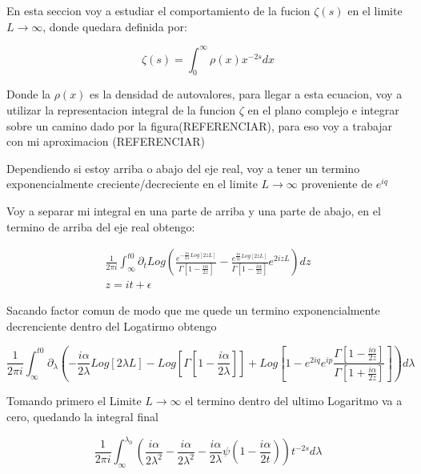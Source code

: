 En esta seccion voy a estudiar el comportamiento de la fucion $\zeta (s) $ en el limite $L \rightarrow \infty$, donde quedara definida por:

\begin{equation}
\zeta (s) = \int _{0} ^{\infty} \rho (x) x^{-2 s} dx
\end{equation}

Donde la $\rho(x) $ es la densidad de autovalores, para llegar a esta ecuacion, voy a utilizar la representacion integral de la funcion $\zeta$ en el plano complejo e integrar sobre un camino dado por la figura(REFERENCIAR), para eso voy a trabajar con mi aproximacion (REFERENCIAR)



Dependiendo si estoy arriba o abajo del eje real, voy a tener un termino exponencialmente creciente/decreciente en el limite $L \rightarrow \infty$ proveniente de $e ^{i q}$

Voy a separar mi integral en una parte de arriba y una parte de abajo, en el termino de arriba del eje real obtengo:

\begin{equation}
\begin{array}{c}
\frac{1}{2 \pi i} \int _{\infty} ^{t0} 
\partial _t
Log
\left(
\frac{e ^{- \frac{i \alpha}{2 \lambda} Log[2 z  L]} }{\Gamma[1-\frac{i \alpha}{2 z }]} -
\frac{e ^{ \frac{i \alpha}{2 z } Log[2 z  L]} }{\Gamma[1-\frac{i \alpha}{2 z }]}
e ^{2 i z  L }
\right) d z \\
z = i t + \epsilon 
\end{array}
\end{equation}

Sacando factor comun de modo que me quede un termino exponencialmente decrenciente dentro del Logatirmo obtengo

\begin{equation}
\frac{1}{2 \pi i}  \int _{\infty} ^{t0} 
\partial _{\lambda}
\left(
-\frac{i\alpha}{2 \lambda} Log[2 \lambda L] - Log[\Gamma[1- \frac{i \alpha}{2 \lambda}]] +
Log[1- e ^{2 i q} e ^{i p} \frac{ \Gamma[1-\frac{i \alpha}{2 z }]}{ \Gamma[1+\frac{i \alpha}{2 z }]} ]
\right)
d \lambda
\end{equation}


Tomando primero el Limite $L \rightarrow \infty $ el termino dentro del ultimo Logaritmo va a cero, quedando la integral final 

\begin{equation}
\frac{1}{2 \pi i} \int _{\infty} ^{\lambda_0} 
\left(
\frac{i \alpha}{2 \lambda ^2} -
\frac{i \alpha}{2\lambda ^2} -
\frac{i \alpha}{2 \lambda } \psi (1 - \frac{i \alpha}{2 t}) 
\right)
t ^{-2s} d \lambda
\end{equation}

